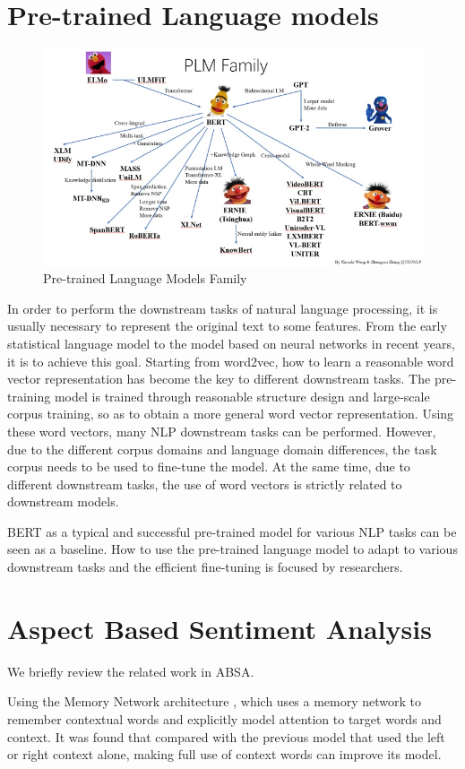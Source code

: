 \documentclass[fyp]{socreport}
\begin{document}
\section{Pre-trained Language models}
\begin{figure}[h]
    \centering
    \includegraphics[width=0.7\linewidth]{./image/PLM.jpg}
    \caption{Pre-trained Language Models Family}
  \label{example}
\end{figure}

In order to perform the downstream tasks of natural language processing, it is usually necessary to represent the original text to some features. From the early statistical language model to the model based on neural networks in recent years, it is to achieve this goal. Starting from word2vec, how to learn a reasonable word vector representation has become the key to different downstream tasks. The pre-training model is trained through reasonable structure design and large-scale corpus training, so as to obtain a more general word vector representation. Using these word vectors, many NLP downstream tasks can be performed. However, due to the different corpus domains and language domain differences, the task corpus needs to be used to fine-tune the model. At the same time, due to different downstream tasks, the use of word vectors is strictly related to downstream models.

BERT \cite{devlinBERTPretrainingDeep2019} as a typical and successful pre-trained model for various NLP tasks can be seen as a baseline.  How to use the pre-trained language model to adapt to various downstream tasks and the efficient fine-tuning is focused by researchers.

\section{Aspect Based Sentiment Analysis}
We briefly review the related work in ABSA.

Using the Memory Network architecture \cite {Tang2016}, which uses a memory network to remember contextual words and explicitly model attention to target words and context.
It was found that compared with the previous model \cite {Tang2015} that used the left or right context alone, making full use of context words can improve its model.
\end{document}
